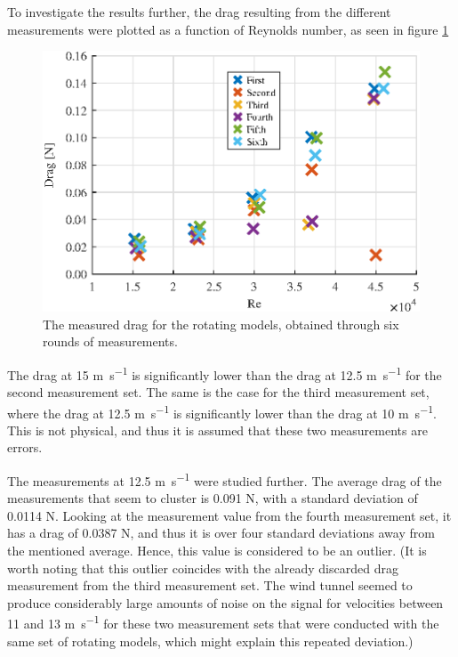 To investigate the results further, the drag resulting from the different measurements were plotted as a function of Reynolds number, as seen in figure \ref{fig:RotationalDrag}


\begin{figure}
    \centering
    \includegraphics[width=\linewidth]{0_Images/RotationalDragRe.eps}
    \caption{The measured drag for the rotating models, obtained through six rounds of measurements.}
    \label{fig:RotationalDrag}
\end{figure}

The drag at 15 \si{\m\per\s} is significantly lower than the drag at 12.5 \si{\m\per\s} for the second measurement set. The same is the case for the third measurement set, where the drag at 12.5 \si{\m\per\s} is significantly lower than the drag at 10 \si{\m\per\s}. This is not physical, and thus it is assumed that these two measurements are errors. 

The measurements at 12.5 \si{\m\per\s} were studied further. The average drag of the measurements that seem to cluster is 0.091 \si{\newton}, with a standard deviation of 0.0114 \si{\newton}. Looking at the measurement value from the fourth measurement set, it has a drag of 0.0387 \si{\newton}, and thus it is over four standard deviations away from the mentioned average. Hence, this value is considered to be an outlier. (It is worth noting that this outlier coincides with the already discarded drag measurement from the third measurement set. The wind tunnel seemed to produce considerably large amounts of noise on the signal for velocities between 11 and 13 \si{\m\per\s} for these two measurement sets that were conducted with the same set of rotating models, which might explain this repeated deviation.)

